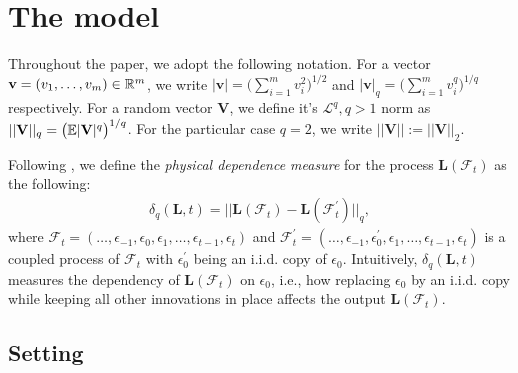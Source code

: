 \documentclass[a4paper,12pt]{article}
\begin{document}
\section{The model}\label{sec:model}

Throughout the paper, we adopt the following notation. For a vector $\mathbf{v} = (v_1, \ldots, v_m)\in\mathbb{R}^m$, we write $|\mathbf{v}| = \big(\sum_{i=1}^m v_i^2\big)^{1/2}$ and $|\mathbf{v}|_q = \big(\sum_{i=1}^m v_i^q\big)^{1/q}$ respectively. For a random vector $\mathbf{V}$, we define it's $\mathcal{L}^q, q>1$ norm as $||\mathbf{V}||_q = \big(\mathbb{E} |\mathbf{V}|^q\big)^{1/q}$. For the particular case $q = 2$, we write $||\mathbf{V}|| := ||\mathbf{V}||_2$.

Following \cite{Wu2005}, we define the \textit{physical dependence measure} for the process $\mathbf{L}(\mathcal{F}_t)$ as the following:
\begin{align}\label{eq:physical_dep}
 \delta_q(\mathbf{L}, t) = || \mathbf{L}(\mathcal{F}_t) - \mathbf{L}(\mathcal{F}_t^\prime) ||_q,
\end{align}
where $\mathcal{F}_t  = (\ldots, \epsilon_{-1}, \epsilon_0, \epsilon_1, \ldots, \epsilon_{t-1}, \epsilon_t)$ and $\mathcal{F}_t^\prime  = (\ldots, \epsilon_{-1}, \epsilon^\prime_0, \epsilon_1, \ldots, \epsilon_{t-1}, \epsilon_t)$ is a coupled process of $\mathcal{F}_t$ with $\epsilon_0^\prime$ being an i.i.d. copy of $\epsilon_0$. Intuitively, $\delta_q(\mathbf{L}, t)$ measures the dependency of $\mathbf{L}(\mathcal{F}_t)$ on $\epsilon_0$, i.e., how replacing $\epsilon_0$ by an i.i.d. copy while keeping all other innovations in place affects the output $\mathbf{L}(\mathcal{F}_t)$.

\subsection{Setting}\label{subsec:model_setting}
\end{document}
